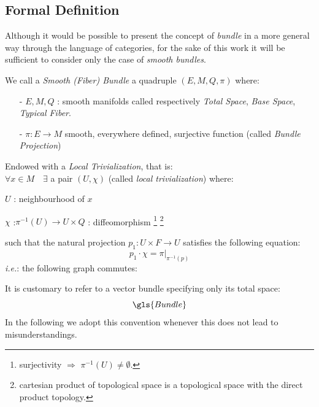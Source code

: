 \documentclass[Main]{subfiles}
\begin{document}
		\subsection{Formal Definition}
			Although it would be possible to present the concept of \emph{bundle} in a more general way through the language of categories, for the sake of this work it will be sufficient to consider only the case of \emph{smooth bundles}.
			\begin{definition}\label{Def:SmoothBundle}
				We call a \emph{Smooth (Fiber) Bundle}  a quadruple $(E,M,Q,\pi)$ where:
				\begin{itemize}
					\item[-] $E,M,Q$ :  smooth manifolds called respectively \emph{Total Space}, \emph{Base Space}, \emph{Typical Fiber}.
					\item[-] $\pi : E \rightarrow M $ smooth, everywhere defined, surjective function (called \emph{Bundle Projection})
				\end{itemize}
				Endowed with a \emph{Local Trivialization}, that is:\\
				$\forall x \in M \quad \exists$ a pair $(U, \chi)$ (called \emph{local trivialization}) where:
					\begin{compactitemize}
						\item $U$ : neighbourhood of $x$
						\item $\chi$ :$\pi^{-1}(U) \rightarrow U \times Q$ : diffeomorphism
 							\footnote{surjectivity $\Rightarrow$ $\pi^{-1}(U) \neq \emptyset$.}
 							\footnote{cartesian product of topological space is a topological space with the direct product topology.}
					\end{compactitemize}
				such that the natural projection $p_1 : U \times F \rightarrow U$ satisfies the following equation: $$p_1 \cdot \chi = \pi \vert_{\pi^{-1}(p)}$$
					\textit{i.e.}: the following graph commutes:
					\vspace{-2mm}
					\begin{center}
					\end{center}

			\end{definition}
				It is customary to refer to a vector bundle specifying only its total space:
				\begin{displaymath}
					\gls{Bundle}%
				\end{displaymath}
			 	In the following we adopt this convention whenever this does not lead to misunderstandings.
\end{document}
